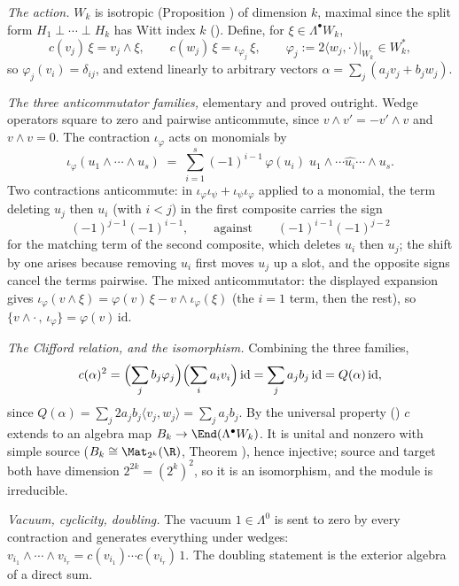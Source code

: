 \emph{The action.} $W_k$ is isotropic (Proposition ) of dimension $k$, maximal since the split form $H_1 \perp \cdots \perp H_k$ has Witt index $k$ (). Define, for $\xi \in \Lambda^\bullet W_k$,
\[
c(v_j)\,\xi = v_j \wedge \xi, \qquad c(w_j)\,\xi = \iota_{\varphi_j}\,\xi, \qquad \varphi_j := 2\langle w_j, \cdot\,\rangle|_{W_k} \in W_k^* ,
\]
so $\varphi_j(v_i) = \delta_{ij}$, and extend linearly to arbitrary vectors $\alpha = \sum_j (a_j v_j + b_j w_j)$.

\emph{The three anticommutator families,} elementary and proved outright. Wedge operators square to zero and pairwise anticommute, since $v \wedge v' = -v' \wedge v$ and $v \wedge v = 0$. The contraction $\iota_\varphi$ acts on monomials by
\[
\iota_\varphi(u_1 \wedge \cdots \wedge u_s) \;=\; \sum_{i=1}^{s} (-1)^{i-1}\, \varphi(u_i)\; u_1 \wedge \cdots \widehat{u_i} \cdots \wedge u_s .
\]
Two contractions anticommute: in $\iota_\varphi \iota_\psi + \iota_\psi \iota_\varphi$ applied to a monomial, the term deleting $u_j$ then $u_i$ (with $i < j$) in the first composite carries the sign
\[
(-1)^{j-1}(-1)^{i-1},
\qquad \text{against} \qquad
(-1)^{i-1}(-1)^{j-2}
\]
for the matching term of the second composite, which deletes $u_i$ then $u_j$; the shift by one arises because removing $u_i$ first moves $u_j$ up a slot, and the opposite signs cancel the terms pairwise. The mixed anticommutator: the displayed expansion gives $\iota_\varphi(v \wedge \xi) = \varphi(v)\,\xi - v \wedge \iota_\varphi(\xi)$ (the $i = 1$ term, then the rest), so $\{v \wedge \cdot\,,\, \iota_\varphi\} = \varphi(v)\,\mathrm{id}$.

\emph{The Clifford relation, and the isomorphism.} Combining the three families,
\[
c(\alpha)^2 = \Bigl(\sum_j b_j \varphi_j\Bigr)\Bigl(\sum_i a_i v_i\Bigr)\,\mathrm{id} = \sum_j a_j b_j\,\mathrm{id} = Q(\alpha)\,\mathrm{id},
\]
since $Q(\alpha) = \sum_j 2 a_j b_j \langle v_j, w_j\rangle = \sum_j a_j b_j$. By the universal property () $c$ extends to an algebra map $B_k \to \End(\Lambda^\bullet W_k)$. It is unital and nonzero with simple source ($B_k \cong \Mat_{2^k}(\R)$, Theorem ), hence injective; source and target both have dimension $2^{2k} = (2^k)^2$, so it is an isomorphism, and the module is irreducible.

\emph{Vacuum, cyclicity, doubling.} The vacuum $1 \in \Lambda^0$ is sent to zero by every contraction and generates everything under wedges: $v_{i_1} \wedge \cdots \wedge v_{i_r} = c(v_{i_1}) \cdots c(v_{i_r})\,1$. The doubling statement is the exterior algebra of a direct sum.
